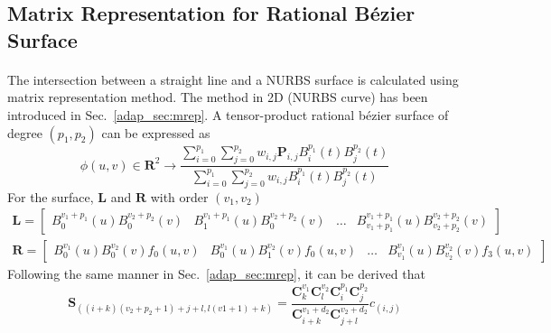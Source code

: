 \subsection{Matrix Representation for Rational Bézier Surface}
\label{oct_sec:mrep}
\paragraph{}
The intersection between a straight line and a NURBS surface is calculated using matrix representation method.
The method in 2D (NURBS curve) has been introduced in Sec.~\ref{adap_sec:mrep}.
A tensor-product rational bézier surface of degree $(p_1,p_2)$ can be expressed as
\begin{equation}
	\phi(u,v)\in\mathbf{R}^2 \rightarrow \frac{\sum_{i=0}^{p_1}\sum_{j=0}^{p_2}w_{i,j}\mathbf{P}_{i,j}B_i^{p_1}(t)B_j^{p_2}(t) }{\sum_{i=0}^{p_1}\sum_{j=0}^{p_2}w_{i,j}B_i^{p_1}(t)B_j^{p_2}(t)}
\end{equation}
%
For the surface, $\mathbf{L}$ and $\mathbf{R}$ with order $(v_1,v_2)$
\begin{subequations}
\begin{align}
	\mathbf{L} =
	\begin{bmatrix}
		B_0^{v_1+p_1}(u)B_0^{v_2+p_2}(v) & B_1^{v_1+p_1}(u)B_0^{v_2+p_2}(v) & \dots & B_{v_1+p_1}^{v_1+p_1}(u)B_{v_2+p_2}^{v_2+p_2}(v)
	\end{bmatrix} \\
	\mathbf{R} =
	\begin{bmatrix}
		B_0^{v_1}(u)B_0^{v_2}(v)f_0(u,v) & B_0^{v_1}(u)B_1^{v_2}(v)f_0(u,v) & \dots & B_{v_1}^{v_1}(u)B_{v_2}^{v_2}(v)f_3(u,v)
	\end{bmatrix}
\end{align}
\end{subequations}
%
Following the same manner in Sec.~\ref{adap_sec:mrep}, it can be derived that 
\begin{equation}
	\mathbf{S}_{\left( (i+k)(v_2+p_2+1)+j+l, l(v1+1)+k\right)} = 
	\frac{\mathbf{C}_k^{v_1}\mathbf{C}_l^{v_2}\mathbf{C}_i^{p_1}\mathbf{C}_j^{p_2}} 
		{\mathbf{C}_{i+k}^{v_1+d_2}\mathbf{C}_{j+l}^{v_2+d_2}}c_{(i,j)}
\end{equation}
%
